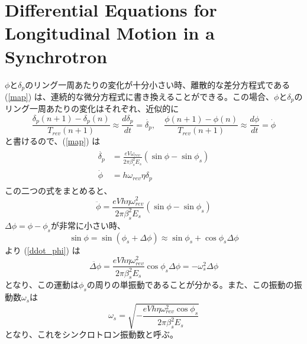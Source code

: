 \documentclass[10pt,a4paper]{jlreq}
\begin{document}
\section{Differential Equations for Longitudinal Motion in a Synchrotron}
$\phi$と$\delta_p$のリング一周あたりの変化が十分小さい時、離散的な差分方程式である (\ref{map}) は、連続的な微分方程式に書き換えることができる。この場合、$\phi$と$\delta_p$のリング一周あたりの変化はそれぞれ、近似的に
%
\begin{equation}
  \frac{\delta_p(n+1)-\delta_p(n)}{T_{rev}(n+1)} \approx \frac{d\delta_p}{dt}=\dot{\delta_p},\quad 
  \frac{\phi(n+1)-\phi(n)}{T_{rev}(n+1)} \approx \frac{d\phi}{dt}= \dot{\phi}
\end{equation}
%
と書けるので、(\ref{map}) は
%
\begin{align}
    \begin{split}
      \dot{\delta_p} &= \frac{e V \omega_{rev}}{2\pi \beta_s^2 E_s}(\sin\phi - \sin\phi_s) \\
      \dot{\phi} &= h \omega_{rev} \eta \delta_p
    \end{split}
\end{align}
%
この二つの式をまとめると、
%
\begin{equation}
  \ddot{\phi} = \frac{e V h \eta \omega_{rev}^2}{2\pi\beta_s^2 E_s}(\sin\phi-\sin\phi_s)
  \label{ddot_phi}
\end{equation}
%
$\Delta\phi = \phi - \phi_s$が非常に小さい時、
%
\begin{equation}
  \sin\phi = \sin(\phi_s+\Delta\phi) \approx \sin\phi_s + \cos\phi_s \Delta\phi
\end{equation}
%
より (\ref{ddot_phi}) は
%
\begin{equation}
  \ddot{\Delta\phi} = \frac{e V h \eta \omega_{rev}^2}{2\pi \beta_s^2 E_s} \cos\phi_s \Delta\phi = - \omega_s^2 \Delta\phi
\end{equation}
%
となり、この運動は$\phi_s$の周りの単振動であることが分かる。また、この振動の振動数$\omega_s$は
%
\begin{equation}
  \omega_s = \sqrt{-\frac{e V h \eta \omega_{rev}^2 \cos\phi_s}{2\pi \beta_s^2 E_s}}
\end{equation}
%
となり、これをシンクロトロン振動数と呼ぶ。
%
\vspace{\baselineskip}
\end{document}
